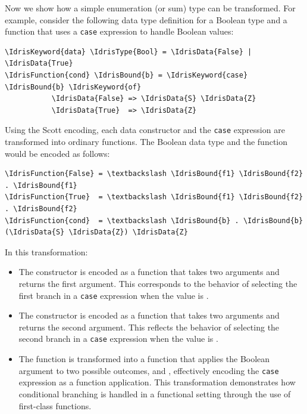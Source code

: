 \documentclass{IEEEtran}
\begin{document}
\par Now we show how a simple enumeration (or sum) type can be transformed. For example, consider the following data type definition for a Boolean type and a function that uses a \texttt{case} expression to handle Boolean values:

\par
\begin{Verbatim}
\IdrisKeyword{data} \IdrisType{Bool} = \IdrisData{False} | \IdrisData{True}
\IdrisFunction{cond} \IdrisBound{b} = \IdrisKeyword{case} \IdrisBound{b} \IdrisKeyword{of}
           \IdrisData{False} => \IdrisData{S} \IdrisData{Z}
           \IdrisData{True}  => \IdrisData{Z}
\end{Verbatim}

\par Using the Scott encoding, each data constructor and the \texttt{case} expression are transformed into ordinary functions. The Boolean data type  and the function  would be encoded as follows:

\begin{Verbatim}
\IdrisFunction{False} = \textbackslash \IdrisBound{f1} \IdrisBound{f2} . \IdrisBound{f1}
\IdrisFunction{True}  = \textbackslash \IdrisBound{f1} \IdrisBound{f2} . \IdrisBound{f2}
\IdrisFunction{cond}  = \textbackslash \IdrisBound{b} . \IdrisBound{b} (\IdrisData{S} \IdrisData{Z}) \IdrisData{Z}
\end{Verbatim}

\par In this transformation:
\begin{itemize}
    \item The constructor  is encoded as a function that takes two arguments and returns the first argument. This corresponds to the behavior of selecting the first branch in a \texttt{case} expression when the value is .
    \item The constructor  is encoded as a function that takes two arguments and returns the second argument. This reflects the behavior of selecting the second branch in a \texttt{case} expression when the value is .
    \item The function  is transformed into a function that applies the Boolean argument  to two possible outcomes,   and , effectively encoding the \texttt{case} expression as a function application. This transformation demonstrates how conditional branching is handled in a functional setting through the use of first-class functions.
\end{itemize}
\end{document}

